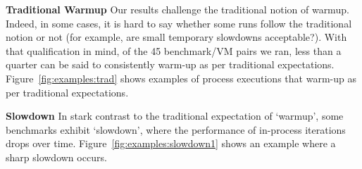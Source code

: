 \documentclass[a4paper,UKenglish]{lipics}
\begin{document}
\textbf{Traditional Warmup} Our results challenge the traditional notion of
warmup. Indeed, in some cases, it is hard to say whether some runs follow the
traditional notion or not (for example, are small temporary slowdowns
acceptable?). With that qualification in mind, of the 45 benchmark/VM pairs we ran,
less than a quarter can be said to consistently warm-up as per traditional
expectations. Figure~\ref{fig:examples:trad} shows examples of process executions that
warm-up as per traditional expectations.


\textbf{Slowdown} \label{sub:slowdowns}
In stark contrast to the traditional expectation of `warmup', some benchmarks
exhibit `slowdown', where the performance of
in-process iterations drops over time. Figure~\ref{fig:examples:slowdown1} shows
an example where a sharp slowdown occurs.
\end{document}
